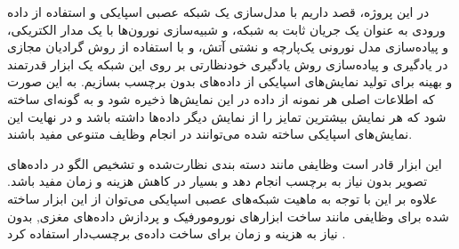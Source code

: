 در این پروژه، قصد داریم با مدل‌سازی یک شبکه عصبی اسپایکی و استفاده از داده ورودی به عنوان یک جریان ثابت به شبکه، و شبیه‌سازی نورون‌ها با یک مدار الکتریکی، و پیاده‌سازی مدل نورونی یک‌پارچه و نشتی آتش، و با استفاده از روش گرادیان مجازی در یادگیری و پیاده‌سازی روش یادگیری خودنظارتی بر روی این شبکه یک ابزار قدرتمند و بهینه برای تولید نمایش‌های اسپایکی از داده‌های بدون برچسب بسازیم. به این صورت که اطلاعات اصلی هر نمونه از داده در این نمایش‌ها ذخیره شود و به گونه‌ای ساخته شود که هر نمایش بیشترین تمایز را از نمایش دیگر داده‌ها داشته باشد و در نهایت این نمایش‌‌های اسپایکی ساخته شده می‌توانند در انجام وظایف متنوعی مفید باشند.

این ابزار قادر است وظایفی مانند دسته بندی نظارت‌شده و تشخیص الگو در داده‌های تصویر بدون نیاز به برچسب انجام دهد و بسیار در کاهش هزینه و زمان مفید باشد. علاوه بر این با توجه به ماهیت شبکه‌های عصبی اسپایکی می‌توان از این ابزار ساخته شده برای وظایفی مانند ساخت ابزار‌های نورومورفیک و پردازش داده‌های مغزی, بدون نیاز به هزینه و زمان برای ساخت داده‌ی برچسب‌دار استفاده کرد .








